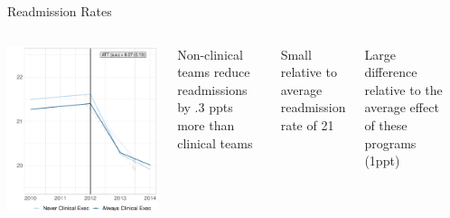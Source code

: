 \documentclass[notes,11pt, aspectratio=169]{beamer}
\newenvironment{wideitemize}{\itemize\addtolength{\itemsep}{10pt}}{\enditemize}
\begin{document}
\begin{frame}{Readmission Rates}\label{main:readrates}
    \begin{columns}
        \centering
        \includegraphics[width=.9\textwidth]{Objects/read_md_nomd_synth_graph.pdf}
        \begin{wideitemize}
            \item Non-clinical teams reduce readmissions by .3 ppts more than clinical teams 
            \item Small relative to average readmission rate of 21
            \item Large difference relative to the average effect of these programs (1ppt)
        \end{wideitemize}
        
        \vspace{7mm}

        \hyperlink{int_margin}{}
        
    \end{columns}
\end{frame}
\end{document}

